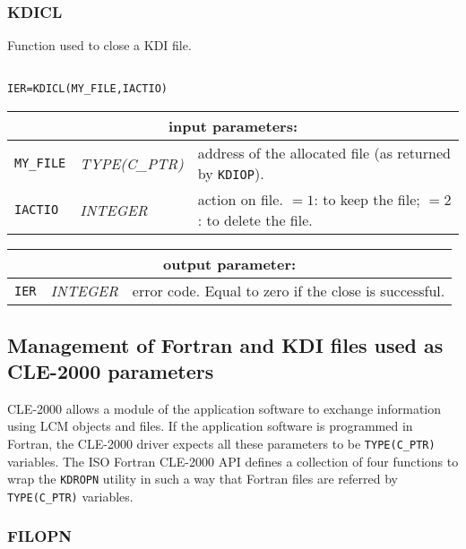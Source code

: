 \subsubsection{KDICL}

Function used to close a KDI file.

\begin{verbatim}

IER=KDICL(MY_FILE,IACTIO)
\end{verbatim}

\noindent
\begin{tabular}{|p{1.5cm}|p{3cm}|p{10cm}|}
\hline
\multicolumn{3}{|c|}{\bf input parameters:} \\
\hline
{\tt MY\_FILE} & {\it TYPE(C\_PTR)} &  address of the allocated file (as returned by {\tt KDIOP}). \\
\hline
{\tt IACTIO} & {\it INTEGER}  & action on file.
$=1$: to keep the file;
$=2$: to delete the file.  \\
\hline
\end{tabular}

\vskip 0.4cm
\goodbreak
\noindent
\begin{tabular}{|p{1.5cm}|p{3cm}|p{10cm}|}
\hline
\multicolumn{3}{|c|}{\bf output parameter:} \\
\hline
{\tt IER} & {\it INTEGER}  & error code. Equal to zero if the close is successful.  \\
\hline
\end{tabular}

\vskip 0.8cm

\subsection {Management of Fortran and KDI files used as CLE-2000 parameters}

CLE-2000 allows a module of the application software to exchange information using LCM objects and files. If the
application software is programmed in Fortran, the CLE-2000 driver expects all these parameters to be {\tt TYPE(C\_PTR)}
variables. The ISO Fortran CLE-2000 API defines a collection of four functions to wrap the {\tt KDROPN} utility
in such a way that Fortran files are  referred by {\tt TYPE(C\_PTR)} variables.

\subsubsection{FILOPN}


